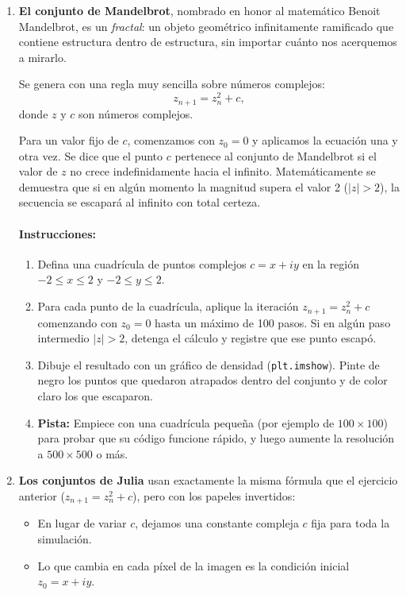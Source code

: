 \documentclass[12pt]{article}
\begin{document}

\begin{problemas}[]
\begin{enumerate}[leftmargin=*]

\item \textbf{El conjunto de Mandelbrot}, nombrado en honor al matemático 
Benoit Mandelbrot, es un \textit{fractal}: un objeto geométrico 
infinitamente ramificado que contiene estructura dentro de estructura, 
sin importar cuánto nos acerquemos a mirarlo.

Se genera con una regla muy sencilla sobre números complejos:
\begin{equation}
    z_{n+1} = z_n^2 + c,
\end{equation}
donde $z$ y $c$ son números complejos. 

Para un valor fijo de $c$, comenzamos con $z_0 = 0$ y 
aplicamos la ecuación una y otra vez. 
Se dice que el punto $c$ pertenece al conjunto de Mandelbrot 
si el valor de $z$ no crece indefinidamente hacia el infinito. 
Matemáticamente se demuestra que si en algún momento 
la magnitud supera el valor 2 ($|z| > 2$), 
la secuencia se escapará al infinito con total certeza.

\paragraph{Instrucciones:}
\begin{enumerate}
    \item Defina una cuadrícula de puntos complejos $c = x + iy$ en la región 
    $-2 \le x \le 2$ y $-2 \le y \le 2$.
    \item Para cada punto de la cuadrícula, aplique la iteración $z_{n+1} = z_n^2 + c$ 
    comenzando con $z_0 = 0$ hasta un máximo de 100 pasos. 
    Si en algún paso intermedio $|z| > 2$, 
    detenga el cálculo y registre que ese punto escapó.
    \item Dibuje el resultado con un gráfico de densidad (\texttt{plt.imshow}). 
    Pinte de negro los puntos que quedaron atrapados dentro del conjunto y de color 
    claro los que escaparon.
    \item \textbf{Pista:} Empiece con una cuadrícula pequeña 
    (por ejemplo de $100 \times 100$) para probar que su código funcione rápido, 
    y luego aumente la resolución a $500 \times 500$ o más.
\end{enumerate}

\item \textbf{Los conjuntos de Julia} usan exactamente la misma fórmula que el ejercicio 
anterior ($z_{n+1} = z_n^2 + c$), pero con los papeles invertidos:
\begin{itemize}
    \item En lugar de variar $c$, dejamos una constante compleja $c$ fija para toda
     la simulación.
    \item Lo que cambia en cada píxel de la imagen es la condición inicial 
    $z_0 = x + iy$.
\end{itemize}


\end{enumerate}
\end{problemas}
\end{document}
